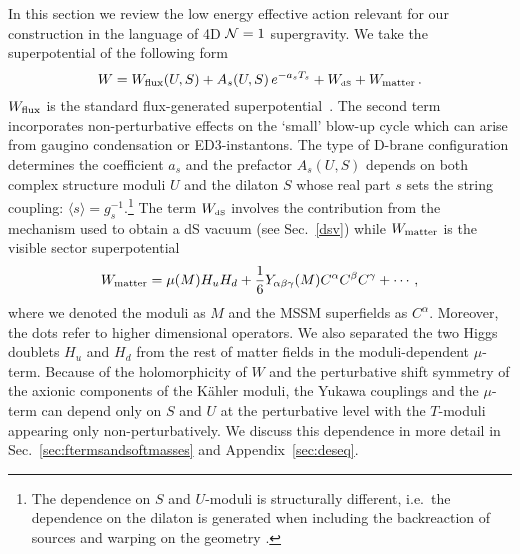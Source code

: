 \documentclass[11pt,a4paper]{article}
\newcommand{\be}{\begin{equation}}
\newcommand{\ee}{\end{equation}}
\def\dS{{\scriptscriptstyle \rm dS}}
\begin{document}
In this section we review the low energy effective action relevant for our construction
in the language of 4D ${\cal N}=1$ supergravity.
We take the superpotential of the following form
\be
W= W_{\rm flux}(U,S) + A_s(U, S)\, e^{- a_s T_s} +  W_\dS+W_{\rm matter}\,.
\label{W}
\ee
$W_{\rm flux}$ is the standard flux-generated superpotential~\cite{Gukov:1999ya}.
The second term incorporates non-perturbative effects on the `small' blow-up cycle which can arise from gaugino condensation or ED3-instantons.
The type of D-brane configuration determines the coefficient $a_s$ and the prefactor $A_s(U,S)$ depends on both complex structure moduli $U$ and the dilaton $S$ whose real part $s$ sets the string coupling: $\langle s\rangle =g_s^{-1}$.\footnote{The dependence on $S$ and $U$-moduli is structurally different, i.e.~the dependence on the dilaton is generated when including the backreaction of sources and warping on the geometry \cite{Baumann:2006th}.}
The term $W_\dS$ involves the contribution from the mechanism used to obtain a dS vacuum (see Sec.~\ref{dsv})
while $W_{\rm matter}$ is the visible sector superpotential
\be
W_{\rm matter} = \mu(M) H_u H_d + \frac 16 Y_{\alpha\beta\gamma}(M) C^\alpha C^\beta C^\gamma + \cdots\,,
\label{Wmatter}
\ee
where we denoted the moduli as $M$ and the MSSM superfields as $C^\alpha$. Moreover, the dots refer to higher dimensional operators.
We also separated the two Higgs doublets $H_u$ and $H_d$ from the rest of matter fields in the moduli-dependent $\mu$-term.
Because of the holomorphicity of $W$ and the perturbative shift symmetry of the axionic components of the K\"ahler moduli,
the Yukawa couplings and the $\mu$-term can depend only on $S$ and $U$ at the perturbative level with the $T$-moduli appearing only non-perturbatively. We discuss this dependence in more detail in Sec.~\ref{sec:ftermsandsoftmasses} and Appendix~\ref{sec:deseq}.
\end{document}
